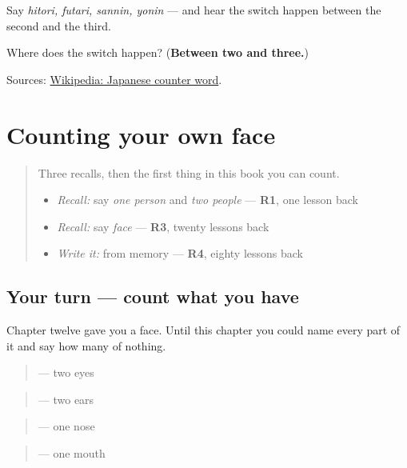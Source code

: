 Say \emph{hitori, futari, sannin, yonin} — and hear the switch happen between the second and the third.

\begin{tcolorbox}[breakable,colback=teal!4,colframe=teal!35!black,title={Before you move on}]
Where does the switch happen? (\textbf{Between two and three.})

Sources: \href{https://en.wikipedia.org/wiki/Japanese\_counter\_word}{Wikipedia: Japanese counter word}.
\end{tcolorbox}
\section[Practice]{Counting your own face}

\label{lesson:JA-C18-count-the-face}



\begin{quote}
Three recalls, then the first thing in this book you can count.

\begin{itemize}
\raggedright
  \item \emph{Recall:} say \emph{one person} and \emph{two people} — \textbf{R1}, one lesson back
  \item \emph{Recall:} say \emph{face} — \textbf{R3}, twenty lessons back
  \item \emph{Write it:} \textbf{} from memory — \textbf{R4}, eighty lessons back
\end{itemize}
\end{quote}

\subsection*{Your turn — count what you have}
Chapter twelve gave you a face. Until this chapter you could name every part of it and say how many of nothing.

\begin{quote}
\textbf{ } — two eyes
\end{quote}

\begin{quote}
\textbf{ } — two ears
\end{quote}

\begin{quote}
\textbf{ } — one nose
\end{quote}

\begin{quote}
\textbf{ } — one mouth
\end{quote}

